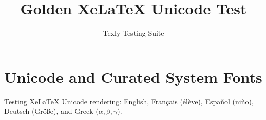 \documentclass{article}
\title{Golden XeLaTeX Unicode Test}
\author{Texly Testing Suite}
\begin{document}
\maketitle

\section{Unicode and Curated System Fonts}
Testing XeLaTeX Unicode rendering:
English, Français (élève), Español (niño), Deutsch (Größe), and Greek ($\alpha, \beta, \gamma$).
\end{document}
